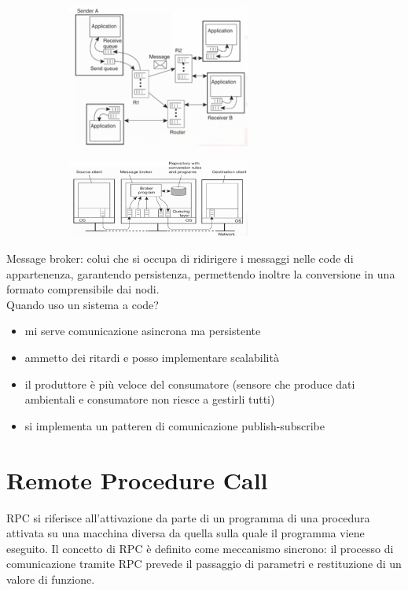 \documentclass[12pt,italian]{report}
\begin{document}
\begin{figure}[h]
     \centering
     \begin{subfigure}[b]{0.3\textwidth}
         \centering
         \includegraphics[width=60mm]{img/code2.png}
     \end{subfigure}
     \hfill
     \begin{subfigure}[b]{0.5\textwidth}
         \centering
          \includegraphics[width=60mm]{img/code3.png}
     \end{subfigure}
\end{figure}
Message broker: colui che si occupa di ridirigere i messaggi nelle code di appartenenza, garantendo persistenza, permettendo inoltre la conversione in una formato comprensibile dai nodi. \\
Quando uso un sistema a code?
\begin{itemize}
    \item mi serve comunicazione asincrona ma persistente
    \item ammetto dei ritardi e posso implementare scalabilità
    \item il produttore è più veloce del consumatore (sensore che produce dati ambientali e consumatore non riesce a gestirli tutti)
    \item si implementa un patteren di comunicazione publish-subscribe
\end{itemize}

\section{Remote Procedure Call}
RPC si riferisce all'attivazione da parte di un programma di una procedura attivata su una macchina diversa da quella sulla quale il programma viene eseguito. 
\bigbreak
Il concetto di RPC è definito come meccanismo sincrono: il processo di comunicazione tramite RPC prevede il passaggio di parametri e restituzione di un valore di funzione.
\end{document}
